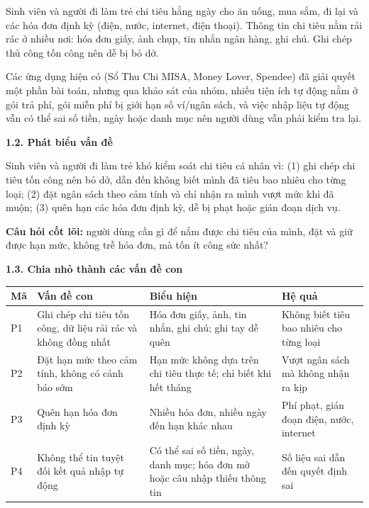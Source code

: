 \documentclass[a4paper,14pt]{extarticle}
\renewcommand{\arraystretch}{1.08}
\newcommand{\TableText}{\footnotesize}
\newcommand{\TableStart}{%
    \begingroup
    \TableText
    \renewcommand{\arraystretch}{1.05}
}
\newcommand{\TableEnd}{\endgroup}
\begin{document}
Sinh viên và người đi làm trẻ chi tiêu hằng ngày cho ăn uống,
mua sắm, đi lại và các hóa đơn định kỳ (điện, nước, internet,
điện thoại). Thông tin chi tiêu nằm rải rác ở nhiều nơi: hóa đơn
giấy, ảnh chụp, tin nhắn ngân hàng, ghi chú. Ghi chép thủ công
tốn công nên dễ bị bỏ dở.

Các ứng dụng hiện có (Sổ Thu Chi MISA, Money Lover, Spendee)
đã giải quyết một phần bài toán, nhưng qua khảo sát của nhóm,
nhiều tiện ích tự động nằm ở gói trả phí, gói miễn phí bị giới hạn
số ví/ngân sách, và việc nhập liệu tự động vẫn có thể sai số tiền,
ngày hoặc danh mục nên người dùng vẫn phải kiểm tra lại.

\vspace{0.5cm}

{\normalsize\bfseries 1.2. Phát biểu vấn đề}

Sinh viên và người đi làm trẻ khó kiểm soát chi tiêu cá nhân vì:
(1) ghi chép chi tiêu tốn công nên bỏ dở, dẫn đến không biết mình
đã tiêu bao nhiêu cho từng loại; (2) đặt ngân sách theo cảm tính
và chỉ nhận ra mình vượt mức khi đã muộn; (3) quên hạn các hóa
đơn định kỳ, dễ bị phạt hoặc gián đoạn dịch vụ.

\textbf{Câu hỏi cốt lõi:} người dùng cần gì để nắm được chi tiêu
của mình, đặt và giữ được hạn mức, không trễ hóa đơn, mà tốn ít
công sức nhất?

\newpage

\vspace{0.5cm}

{\normalsize\bfseries 1.3. Chia nhỏ thành các vấn đề con}
\vspace{0.5cm}

\TableStart
\begingroup
\normalsize
\begin{tabularx}{\textwidth}{
    |P{0.8cm}|P{4.7cm}|P{5.9cm}|Y|
}
\hline
\textbf{Mã}
& \textbf{Vấn đề con}
& \textbf{Biểu hiện}
& \textbf{Hệ quả}
\\
\hline
P1
& Ghi chép chi tiêu tốn công, dữ liệu rải rác và không đồng nhất
& Hóa đơn giấy, ảnh, tin nhắn, ghi chú; ghi tay dễ quên
& Không biết tiêu bao nhiêu cho từng loại
\\
\hline
P2
& Đặt hạn mức theo cảm tính, không có cảnh báo sớm
& Hạn mức không dựa trên chi tiêu thực tế; chỉ biết khi hết tháng
& Vượt ngân sách mà không nhận ra kịp
\\
\hline
P3
& Quên hạn hóa đơn định kỳ
& Nhiều hóa đơn, nhiều ngày đến hạn khác nhau
& Phí phạt, gián đoạn điện, nước, internet
\\
\hline
P4
& Không thể tin tuyệt đối kết quả nhập tự động
& Có thể sai số tiền, ngày, danh mục; hóa đơn mờ hoặc câu nhập thiếu thông tin
& Số liệu sai dẫn đến quyết định sai
\\
\hline
\end{tabularx}
\endgroup
\TableEnd
\end{document}
